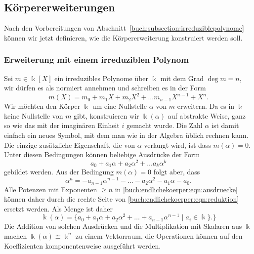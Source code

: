 \subsection{Körpererweiterungen}
Nach den Vorbereitungen von
Abschnitt~\ref{buch:subsection:irreduziblepolynome}
können wir jetzt definieren, wie die Körpererweiterung
konstruiert werden soll.

\subsubsection{Erweiterung mit einem irreduziblen Polynom}
Sei $m\in\Bbbk[X]$ ein irreduzibles Polynome über $\Bbbk$ mit dem Grad
$\deg m=n$,
wir dürfen es als normiert annehmen und schreiben es in der Form
\[
m(X)
=
m_0+m_1X+m_2X^2 + \dots m_{n-1}X^{n-1}+X^n.
\]
Wir möchten den Körper $\Bbbk$ um eine Nullstelle $\alpha$ von $m$
erweitern.
Da es in $\Bbbk$ keine Nullstelle von $m$ gibt, konstruieren wir
$\Bbbk(\alpha)$ auf abstrakte Weise, ganz so wie das mit der imaginären
Einheit $i$ gemacht wurde.
Die Zahl $\alpha$ ist damit einfach ein neues Symbol, mit dem man
wie in der Algebra üblich rechnen kann.
Die einzige zusätzliche Eigenschaft, die von $\alpha$ verlangt wird,
ist dass $m(\alpha)=0$.
Unter diesen Bedingungen können beliebige Ausdrücke der Form
\begin{equation}
a_0 + a_1\alpha + a_2\alpha^2 + \dots a_k\alpha^k
\label{buch:endlichekoerper:eqn:ausdruecke}
\end{equation}
gebildet werden.
Aus der Bedingung $m(\alpha)=0$ folgt aber, dass
\begin{equation}
\alpha^n = -a_{n-1}\alpha^{n-1} -\dots - a_2\alpha^2  - a_1\alpha-a_0.
\label{buch:endlichekoerper:eqn:reduktion}
\end{equation}
Alle Potenzen mit Exponenten $\ge n$ in
\eqref{buch:endlichekoerper:eqn:ausdruecke}
können daher durch die rechte Seite von
\eqref{buch:endlichekoerper:eqn:reduktion}
ersetzt werden.
Als Menge ist daher
\[
\Bbbk(\alpha)
=
\{
a_0+a_1\alpha+a_2\alpha^2+\dots+a_{n-1}\alpha^{n-1}\;|\; a_i\in\Bbbk\}.
\}
\]
Die Addition von solchen Ausdrücken und die Multiplikation mit Skalaren
aus $\Bbbk$ machen $\Bbbk(\alpha)\cong \Bbbk^n$ zu einem Vektorraum,
die Operationen können auf den Koeffizienten komponentenweise ausgeführt
werden.

